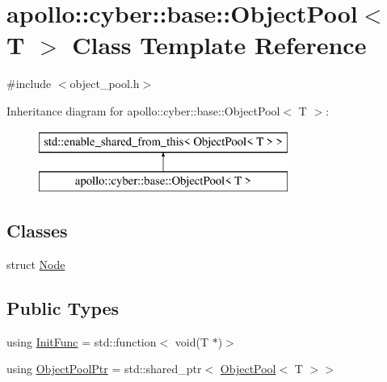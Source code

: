 \hypertarget{classapollo_1_1cyber_1_1base_1_1ObjectPool}{\section{apollo\-:\-:cyber\-:\-:base\-:\-:Object\-Pool$<$ T $>$ Class Template Reference}
\label{classapollo_1_1cyber_1_1base_1_1ObjectPool}
}


{\ttfamily \#include $<$object\-\_\-pool.\-h$>$}

Inheritance diagram for apollo\-:\-:cyber\-:\-:base\-:\-:Object\-Pool$<$ T $>$\-:\begin{figure}[H]
\begin{center}
\leavevmode
\includegraphics[height=2.000000cm]{classapollo_1_1cyber_1_1base_1_1ObjectPool}
\end{center}
\end{figure}
\subsection*{Classes}
\begin{DoxyCompactItemize}
\item 
struct \hyperlink{structapollo_1_1cyber_1_1base_1_1ObjectPool_1_1Node}{Node}
\end{DoxyCompactItemize}
\subsection*{Public Types}
\begin{DoxyCompactItemize}
\item 
using \hyperlink{classapollo_1_1cyber_1_1base_1_1ObjectPool_af46b770564c8080f800088ea25d9a830}{Init\-Func} = std\-::function$<$ void(T $\ast$)$>$
\item 
using \hyperlink{classapollo_1_1cyber_1_1base_1_1ObjectPool_a40cf6e156676c64e8803be8ed930c43a}{Object\-Pool\-Ptr} = std\-::shared\-\_\-ptr$<$ \hyperlink{classapollo_1_1cyber_1_1base_1_1ObjectPool}{Object\-Pool}$<$ T $>$$>$
\end{DoxyCompactItemize}
